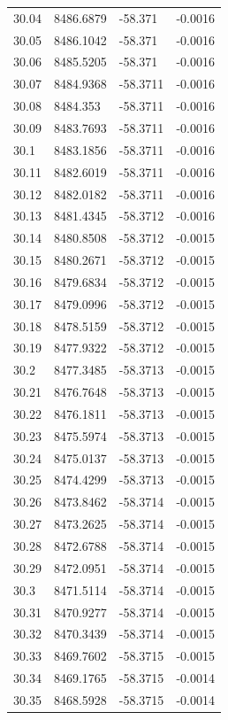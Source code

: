 \begin{table}[H]
\begin{tabular}{llll}
30.04 & 8486.6879 & -58.371 & -0.0016 \\
30.05 & 8486.1042 & -58.371 & -0.0016 \\
30.06 & 8485.5205 & -58.371 & -0.0016 \\
30.07 & 8484.9368 & -58.3711 & -0.0016 \\
30.08 & 8484.353 & -58.3711 & -0.0016 \\
30.09 & 8483.7693 & -58.3711 & -0.0016 \\
30.1 & 8483.1856 & -58.3711 & -0.0016 \\
30.11 & 8482.6019 & -58.3711 & -0.0016 \\
30.12 & 8482.0182 & -58.3711 & -0.0016 \\
30.13 & 8481.4345 & -58.3712 & -0.0016 \\
30.14 & 8480.8508 & -58.3712 & -0.0015 \\
30.15 & 8480.2671 & -58.3712 & -0.0015 \\
30.16 & 8479.6834 & -58.3712 & -0.0015 \\
30.17 & 8479.0996 & -58.3712 & -0.0015 \\
30.18 & 8478.5159 & -58.3712 & -0.0015 \\
30.19 & 8477.9322 & -58.3712 & -0.0015 \\
30.2 & 8477.3485 & -58.3713 & -0.0015 \\
30.21 & 8476.7648 & -58.3713 & -0.0015 \\
30.22 & 8476.1811 & -58.3713 & -0.0015 \\
30.23 & 8475.5974 & -58.3713 & -0.0015 \\
30.24 & 8475.0137 & -58.3713 & -0.0015 \\
30.25 & 8474.4299 & -58.3713 & -0.0015 \\
30.26 & 8473.8462 & -58.3714 & -0.0015 \\
30.27 & 8473.2625 & -58.3714 & -0.0015 \\
30.28 & 8472.6788 & -58.3714 & -0.0015 \\
30.29 & 8472.0951 & -58.3714 & -0.0015 \\
30.3 & 8471.5114 & -58.3714 & -0.0015 \\
30.31 & 8470.9277 & -58.3714 & -0.0015 \\
30.32 & 8470.3439 & -58.3714 & -0.0015 \\
30.33 & 8469.7602 & -58.3715 & -0.0015 \\
30.34 & 8469.1765 & -58.3715 & -0.0014 \\
30.35 & 8468.5928 & -58.3715 & -0.0014 \\

\end{tabular}
\end{table}
